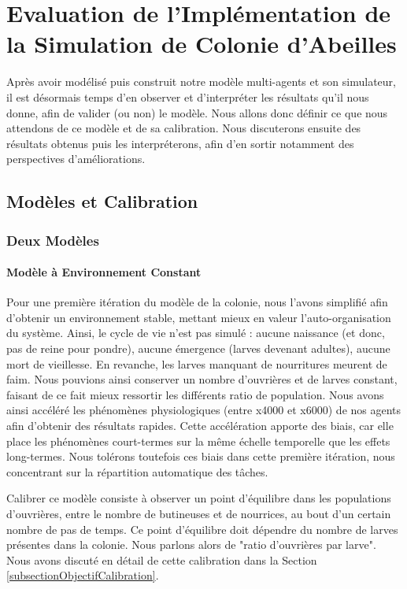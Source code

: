 \chapter{Evaluation de l'Implémentation de la Simulation de Colonie d'Abeilles}
\label{ChapitreEvalSMA}
	Après avoir modélisé puis construit notre modèle multi-agents et son simulateur, il est désormais temps d'en observer et d'interpréter les résultats qu'il nous donne, afin de valider (ou non) le modèle. Nous allons donc définir ce que nous attendons de ce modèle et de sa calibration. Nous discuterons ensuite des résultats obtenus puis les interpréterons, afin d'en sortir notamment des perspectives d'améliorations.
	
	
	\section{Modèles et Calibration}
		\subsection{Deux Modèles}
			\subsubsection{Modèle à Environnement Constant}
			Pour une première itération du modèle de la colonie, nous l'avons simplifié afin d'obtenir un environnement stable, mettant mieux en valeur l'auto-organisation du système. Ainsi, le cycle de vie n'est pas simulé : aucune naissance (et donc, pas de reine pour pondre), aucune émergence (larves devenant adultes), aucune mort de vieillesse. En revanche, les larves manquant de nourritures meurent de faim. Nous pouvions ainsi conserver un nombre d'ouvrières et de larves constant, faisant de ce fait mieux ressortir les différents ratio de population. Nous avons ainsi accéléré les phénomènes physiologiques (entre x4000 et x6000) de nos agents afin d'obtenir des résultats rapides. Cette accélération apporte des biais, car elle place les phénomènes court-termes sur la même échelle temporelle que les effets long-termes. Nous tolérons toutefois ces biais dans cette première itération, nous concentrant sur la répartition automatique des tâches. 
			
			Calibrer ce modèle consiste à observer un point d'équilibre dans les populations d'ouvrières, entre le nombre de butineuses et de nourrices, au bout d'un certain nombre de pas de temps. Ce point d'équilibre doit dépendre du nombre de larves présentes dans la colonie. Nous parlons alors de "ratio d'ouvrières par larve". Nous avons discuté en détail de cette calibration dans la Section \ref{subsectionObjectifCalibration}.
			
